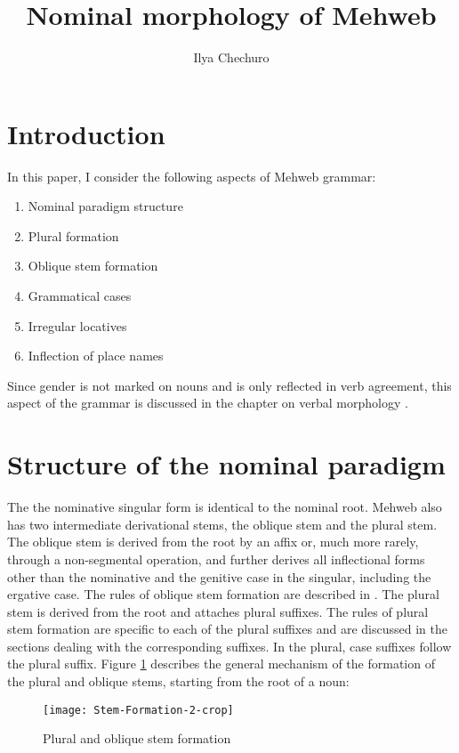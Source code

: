 ﻿\documentclass[output=paper]{langsci/langscibook}
\title{Nominal morphology of Mehweb}
\author{Ilya Chechuro\affiliation{Linguistic Convergence Laboratory, National Research University Higher School of Economics}} %
\begin{document}
\maketitle


\section{Introduction}

In this paper, I consider the following aspects of Mehweb grammar:
\begin{enumerate}[topsep=\medskipamount,itemsep=0pt,partopsep=0pt,parsep=0pt]
\item
  Nominal paradigm structure
\item
  Plural formation
\item
  Oblique stem formation
\item
  Grammatical cases
\item
  Irregular locatives
\item
  Inflection of place names
\end{enumerate}

Since gender is not marked on nouns and is only reflected in verb
agreement, this aspect of the grammar is discussed in the chapter on
verbal morphology \citep{daniel2019}.

\section{Structure of the nominal paradigm}

The the nominative singular form is identical to the nominal root.
Mehweb also has two intermediate derivational stems, the oblique stem
and the plural stem. The oblique stem is derived from the root by an
affix or, much more rarely, through a non-segmental operation, and
further derives all inflectional forms other than the nominative and the genitive case in
the singular, including the ergative case. The rules of oblique stem
formation are described in . The plural stem is derived from
the root and attaches plural suffixes. The rules of plural stem
formation are specific to each of the plural suffixes and are discussed
in the sections dealing with the corresponding suffixes. In the plural,
case suffixes follow the plural suffix. Figure \ref{fig:3:1} describes the general
mechanism of the formation of the plural and oblique stems, starting
from the root of a noun:

\begin{figure}[h]
 \vspace{-24pt}
\texttt{[image: Stem-Formation-2-crop]}
\caption{Plural and oblique stem formation}\label{fig:3:1}
\end{figure}
\end{document}
